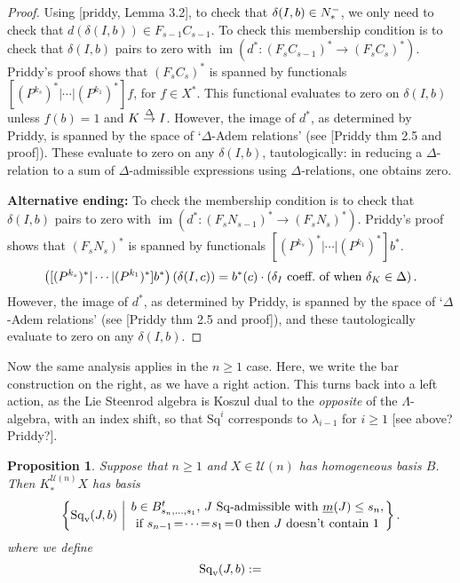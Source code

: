 \documentclass[11pt]{amsart}
\theoremstyle{plain}
\newtheorem{prop}[thm]{Proposition}
\theoremstyle{definition}
\DeclareMathOperator{\im}{im}
\renewcommand{\to}{\longrightarrow}
\newcommand{\calU}{\mathcal{U}}
\theoremstyle{plain}
\newcommand{\deltaalg}{\Delta} %
\newcommand{\minDimSq}{\underline{m}}
\newcommand{\produces}[3]{#3:#1\sim #2}
\renewcommand{\produces}[3]{#1\rightarrow_{#3} #2}%
\renewcommand{\produces}[3]{#1\overset{\smash{#3}}{\rightarrow} #2}%
\newcommand{\Nop}{N^{\smash{-}}}
\newcommand{\Sq}{\mathrm{Sq}}
\begin{document}
\begin{Koszul complexes}
\begin{proof}
Using [priddy, Lemma 3.2], to check that $\delta(I,b)\in\Nop_*$, we only need to check that $d(\delta(I,b))\in F_{s-1}C_{s-1}$.
To check this membership condition is to check that $\delta(I,b)$ pairs to zero with $\im(d^*:(F_sC_{s-1})^*\to(F_sC_s)^*)$. Priddy's proof shows that $(F_sC_s)^*$ is spanned by functionals $[(P^{k_s})^*|\cdots |(P^{k_1})^*]f$, for $f\in X^*$.  This functional evaluates to zero on $\delta(I,b)$ unless $f(b)=1$ and $\produces{K}{I}{\deltaalg}$. However, the image of $d^*$, as determined by Priddy, is spanned by the space of `$\deltaalg$-Adem relations' (see [Priddy thm 2.5 and proof]). These evaluate to zero on any $\delta(I,b)$, tautologically: in reducing a $\deltaalg$-relation to a sum of $\deltaalg$-admissible expressions using $\deltaalg$-relations, one obtains zero.

\textbf{Alternative ending: }To check the membership condition is to check that $\delta(I,b)$ pairs to zero with $\im(d^*:(F_sN_{s-1})^*\to(F_sN_s)^*)$. Priddy's proof shows that $(F_sN_s)^*$ is spanned by functionals $[(P^{k_s})^*|\cdots |(P^{k_1})^*]b^*$. %
\[\left([(P^{k_s})^*|\cdots |(P^{k_1})^*]b^*\right)\left(\delta(I,c)\right)= b^*(c)\cdot\left(\textup{$\delta_I$ coeff.\ of when $\delta_K\in\deltaalg$}\right).\]
However, the image of $d^*$, as determined by Priddy, is spanned by the space of `$\deltaalg$-Adem relations' (see [Priddy thm 2.5 and proof]), and these tautologically evaluate to zero on any $\delta(I,b)$.
\end{proof}
Now the same analysis applies in the $n\geq1$ case. Here, we write the bar construction on the right, as we have a right action. This turns back into a left action, as the Lie Steenrod algebra is Koszul dual to the \emph{opposite} of the $\Lambda$-algebra, with an index shift, so that $\Sq^i$ corresponds to $\lambda_{i-1}$ for $i\geq1$ [see above? Priddy?].
\begin{prop}\label{propDerivedIndTrivialUobject n at least 1}
Suppose that $n\geq1$ and $X\in\calU(n)$ has homogeneous basis $B$. Then $K_*^{\calU(n)}X$ has basis
\[\left\{\Sq_{\textup{v}}(J,b)\ \middle|\ \genfrac{}{}{0pt}{}{b\in B_{s_{n},\ldots,s_1}^t\textup{, $J$ $\Sq$-admissible with }\minDimSq(J)\leq s_n,}{\textup{if }s_{n-1}\!=\!\cdots\!=\!s_1\!=\!0\textup{ then $J$ doesn't contain 1}}\right\}.\]
where we define
\[\Sq_\textup{v}(J,b):=
\]
\end{prop}
\end{Koszul complexes}
\end{document}
